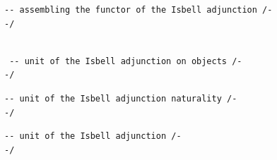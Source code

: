 \documentclass{book}
\theoremstyle{definition}
\newcounter{lcounter}
\begin{document}
\begin{center} \begin{tcolorbox}[width=5in,colback={white},title={\begin{center}\texttt{Lean \thelcounter} \addtocounter{lcounter}{1} \end{center}},colbacktitle=Blue,coltitle=black] \begin{verbatim}
-- assembling the functor of the Isbell adjunction /-
-/
\end{verbatim} \end{tcolorbox} \end{center}
\begin{center} \begin{tcolorbox}[width=5in,colback={white},title={\begin{center}\texttt{Lean \thelcounter} \addtocounter{lcounter}{1} \end{center}},colbacktitle=Blue,coltitle=black] \begin{verbatim}

 -- unit of the Isbell adjunction on objects /-
-/
\end{verbatim} \end{tcolorbox} \end{center}
\begin{center} \begin{tcolorbox}[width=5in,colback={white},title={\begin{center}\texttt{Lean \thelcounter} \addtocounter{lcounter}{1} \end{center}},colbacktitle=Blue,coltitle=black] \begin{verbatim}
-- unit of the Isbell adjunction naturality /-
-/
\end{verbatim} \end{tcolorbox} \end{center}
\begin{center} \begin{tcolorbox}[width=5in,colback={white},title={\begin{center}\texttt{Lean \thelcounter} \addtocounter{lcounter}{1} \end{center}},colbacktitle=Blue,coltitle=black] \begin{verbatim}
-- unit of the Isbell adjunction /-
-/
\end{verbatim} \end{tcolorbox} \end{center}
\end{document}
